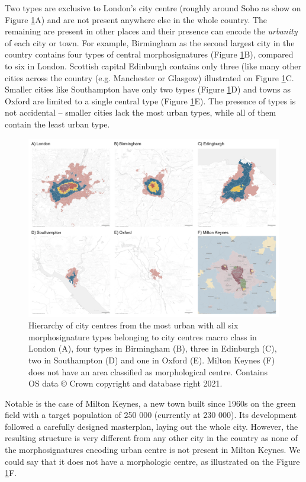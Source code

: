 Two types are exclusive to London's city centre (roughly around Soho as show on Figure
\ref{fig:centres}A) and are not present anywhere else in the whole country. The
remaining are present in other places and their presence can encode the
\textit{urbanity} of each city or town. For example, Birmingham as the second largest
city in the country contains four types of central morphosignatures (Figure
\ref{fig:centres}B), compared to six in London. Scottish capital Edinburgh contains only
three (like many other cities across the country (e.g. Manchester or Glasgow)
illustrated on Figure \ref{fig:centres}C. Smaller cities like Southampton have only two
types (Figure \ref{fig:centres}D) and towns as Oxford are limited to a single central
type (Figure \ref{fig:centres}E). The presence of types is not accidental -- smaller
cities lack the most urban types, while all of them contain the least urban type.

\begin{figure}
    \includegraphics[width=0.75\linewidth, center]{fig/centres.png}
    \caption{Hierarchy of city centres from the most urban with all six morphosignature types
    belonging to city centres macro class in London (A), four types in Birmingham (B),
    three in Edinburgh (C), two in Southampton (D) and one in Oxford (E). Milton Keynes
    (F) does not have an area classified as morphological centre. Contains OS data © Crown copyright and database right 2021.}
    \label{fig:centres}
\end{figure}

Notable is the case of Milton Keynes, a new town built since 1960s on the green field
with a target population of 250 000 (currently at 230 000). Its development followed a
carefully designed masterplan, laying out the whole city. However, the resulting
structure is very different from any other city in the country as none of the morphosignatures
encoding urban centre is not present in Milton Keynes. We could say that it does not
have a morphologic centre, as illustrated on the Figure \ref{fig:centres}F.
